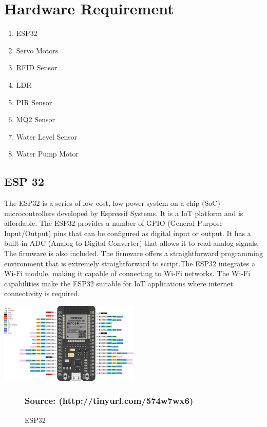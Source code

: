 \documentclass[12pt,a4paper]{report}
\begin{document}
	\section{Hardware Requirement}
	\vspace{4pt}
	\begin{enumerate}
		
		\item  ESP32
		\item  Servo Motors
		\item  RFID Sensor
		\item  LDR
		\item  PIR  Sensor
		\item  MQ2 Sensor
		\item Water Level Sensor
		\item Water Pump Motor
		
		
		
		

	\end{enumerate}
	\vspace{3px}
	\subsection{ESP 32}
	\begin{justify}
		The ESP32 is a series of low-cost, low-power system-on-a-chip (SoC) microcontrollers developed by Espressif Systems. It is a IoT platform and is affordable.  The ESP32 provides a number of GPIO (General Purpose Input/Output) pins that can be configured as digital input or output. It  has a built-in ADC (Analog-to-Digital Converter) that allows it to read analog signals. The firmware is also included. The firmware offers a straightforward programming environment that is extremely straightforward to script.The ESP32 integrates a Wi-Fi module, making it capable of connecting to Wi-Fi networks. The Wi-Fi capabilities make the ESP32 suitable for IoT applications where internet connectivity is required. 
		
		
	\end{justify}
	
	
	\begin{center}
		\includegraphics[width=0.5\textwidth]{images//esp.jpg}\\
		\begin{figure}[ht]
			
			\caption{ESP32 }
			\subsubsection{Source: (http://tinyurl.com/574w7wx6)}
			
		\end{figure}
		
	\end{center}
	
\end{document}
